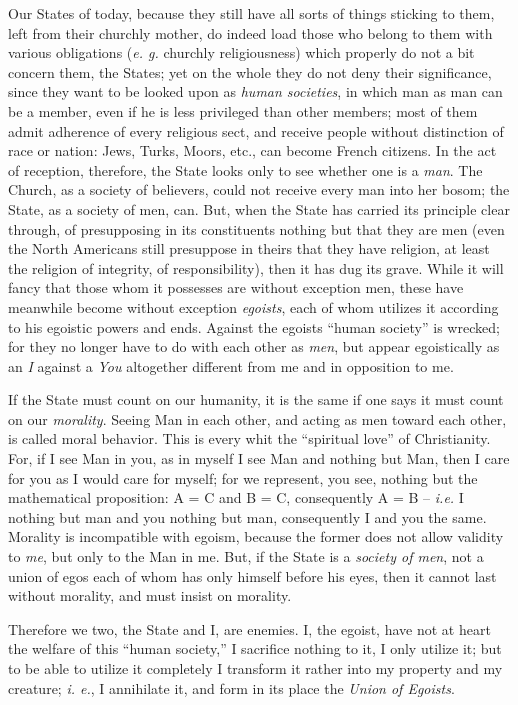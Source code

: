 \documentclass[12pt,a4paper]{book}
\begin{document}
Our States of today, because they still have all sorts of things sticking to 
them, left from their churchly mother, do indeed load those who belong to them 
with various obligations (\textit{e. g.} churchly religiousness) which 
properly do not a bit concern them, the States; yet on the whole they do not 
deny their significance, since they want to be looked upon as \textit{human 
societies}, in which man as man can be a member, even if he is less privileged 
than other members; most of them admit adherence of every religious sect, and 
receive people without distinction of race or nation: Jews, Turks, Moors, 
etc., can become French citizens. In the act of reception, therefore, the 
State looks only to see whether one is a \textit{man}. The Church, as a 
society of believers, could not receive every man into her bosom; the State, 
as a society of men, can. But, when the State has carried its principle clear 
through, of presupposing in its constituents nothing but that they are men 
(even the North Americans still presuppose in theirs that they have religion, 
at least the religion of integrity, of responsibility), then it has dug its 
grave. While it will fancy that those whom it possesses are without exception 
men, these have meanwhile become without exception \textit{egoists}, each of 
whom utilizes it according to his egoistic powers and ends. Against the 
egoists ``human society'' is wrecked; for they no longer have to do with 
each other as \textit{men}, but appear egoistically as an \textit{I} against a 
\textit{You} altogether different from me and in opposition to me.

If the State must count on our humanity, it is the same if one says it must 
count on our \textit{morality}. Seeing Man in each other, and acting as men 
toward each other, is called moral behavior. This is every whit the 
``spiritual love'' of Christianity. For, if I see Man in you, as in myself I 
see Man and nothing but Man, then I care for you as I would care for myself; 
for we represent, you see, nothing but the mathematical proposition: A = C and 
B = C, consequently A = B -- \textit{i.e.} I nothing but man and you nothing 
but man, consequently I and you the same. Morality is incompatible with 
egoism, because the former does not allow validity to \textit{me}, but only to 
the Man in me. But, if the State is a \textit{society of men}, not a union of 
egos each of whom has only himself before his eyes, then it cannot last 
without morality, and must insist on morality.

Therefore we two, the State and I, are enemies. I, the egoist, have not at 
heart the welfare of this ``human society,'' I sacrifice nothing to it, I 
only utilize it; but to be able to utilize it completely I transform it rather 
into my property and my creature; \textit{i. e.}, I annihilate it, and form in 
its place the \textit{Union of Egoists}.
\end{document}
